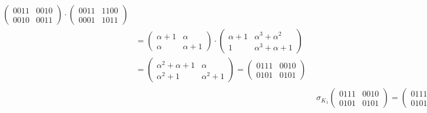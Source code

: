 \documentclass[fleqn]{article}
\begin{document}
\begin{equation*}
\begin{aligned}
\begin{aligned}
\begin{pmatrix}
                    0011 & 0010 \\
                    0010 & 0011
                \end{pmatrix} \cdot
                \begin{pmatrix}
                    0011 & 1100 \\
                    0001 & 1011
                \end{pmatrix} \\ &= 
                 \begin{pmatrix}
                    \alpha + 1 & \alpha \\
                    \alpha & \alpha + 1
                 \end{pmatrix} \cdot
                    \begin{pmatrix} 
                        \alpha + 1 & \alpha^3 + \alpha^2 \\
                        1 & \alpha^3 + \alpha + 1
                    \end{pmatrix} \\ &=
                    \begin{pmatrix}
                        \alpha^2 + \alpha + 1 & \alpha \\
                        \alpha^2 + 1 & \alpha^2 + 1
                    \end{pmatrix} = 
                    \begin{pmatrix}
                        0111 & 0010 \\
                        0101 & 0101
                    \end{pmatrix}
            \end{aligned} \\
            &\sigma_{K_1} \begin{pmatrix}
                0111 & 0010 \\
                0101 & 0101
            \end{pmatrix} =
            \begin{pmatrix}
                0111 & 0010 \\
                0101 & 0101
            \end{pmatrix} +
            \begin{pmatrix}
                0011 & 1110 \\
                0110 & 1011
            \end{pmatrix} =
            \begin{pmatrix}
                0100 & 1100 \\

\end{pmatrix}
\end{aligned}
\end{equation*}
\end{document}
